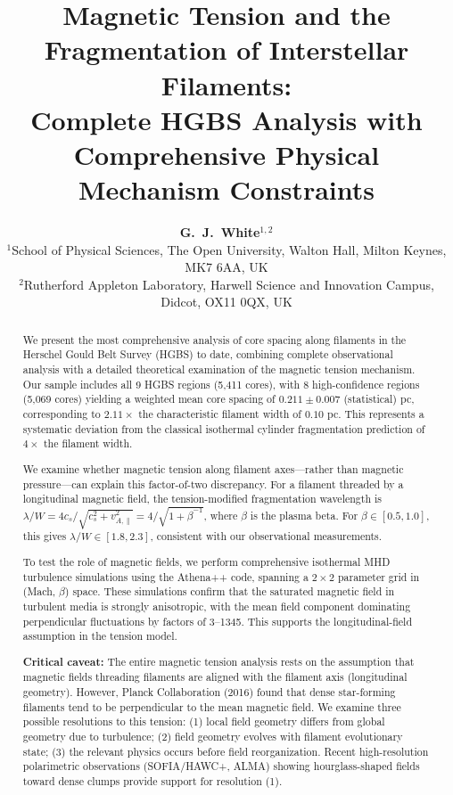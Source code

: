 \documentclass[11pt,a4paper]{article}
\title{\textbf{Magnetic Tension and the Fragmentation of Interstellar Filaments:\\
Complete HGBS Analysis with Comprehensive Physical Mechanism Constraints}}
\author{\textbf{G.~J.~White$^{1,2}$}\\
\small{$^{1}$School of Physical Sciences, The Open University, Walton Hall, Milton Keynes, MK7 6AA, UK}\\
\small{$^{2}$Rutherford Appleton Laboratory, Harwell Science and Innovation Campus, Didcot, OX11 0QX, UK}}
\begin{document}
\maketitle

\begin{abstract}
We present the most comprehensive analysis of core spacing along filaments in the Herschel Gould Belt Survey (HGBS) to date, combining complete observational analysis with a detailed theoretical examination of the magnetic tension mechanism. Our sample includes all 9 HGBS regions (5,411 cores), with 8 high-confidence regions (5,069 cores) yielding a weighted mean core spacing of $0.211 \pm 0.007$ (statistical) pc, corresponding to $2.11\times$ the characteristic filament width of $0.10$ pc. This represents a systematic deviation from the classical isothermal cylinder fragmentation prediction of $4\times$ the filament width.

We examine whether magnetic tension along filament axes---rather than magnetic pressure---can explain this factor-of-two discrepancy. For a filament threaded by a longitudinal magnetic field, the tension-modified fragmentation wavelength is $\lambda/W = 4c_s/\sqrt{c_s^2 + v_{A,\parallel}^2} = 4/\sqrt{1 + \beta^{-1}}$, where $\beta$ is the plasma beta. For $\beta \in [0.5, 1.0]$, this gives $\lambda/W \in [1.8, 2.3]$, consistent with our observational measurements.

To test the role of magnetic fields, we perform comprehensive isothermal MHD turbulence simulations using the Athena++ code, spanning a $2\times2$ parameter grid in (Mach, $\beta$) space. These simulations confirm that the saturated magnetic field in turbulent media is strongly anisotropic, with the mean field component dominating perpendicular fluctuations by factors of 3--1345. This supports the longitudinal-field assumption in the tension model.

\textbf{Critical caveat:} The entire magnetic tension analysis rests on the assumption that magnetic fields threading filaments are aligned with the filament axis (longitudinal geometry). However, Planck Collaboration (2016) found that dense star-forming filaments tend to be perpendicular to the mean magnetic field. We examine three possible resolutions to this tension: (1) local field geometry differs from global geometry due to turbulence; (2) field geometry evolves with filament evolutionary state; (3) the relevant physics occurs before field reorganization. Recent high-resolution polarimetric observations (SOFIA/HAWC+, ALMA) showing hourglass-shaped fields toward dense clumps provide support for resolution (1).


\end{abstract}
\end{document}
